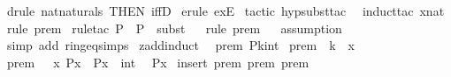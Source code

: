 \begin{isabellebody}
\ {\isacharparenleft}drule\ nat{}naturals\ {\isacharbrackleft}THEN\ iffD{}{\isacharbrackright}{\isacharparenright}\isanewline
{}\isamarkupfalse%
\ {\isacharparenleft}erule\ exE{\isacharparenright}\isanewline
{}\isamarkupfalse%
\ {\isacharparenleft}tactic\ {\isacharverbatimopen}hyp{\isacharunderscore}subst{\isacharunderscore}tac\ {}{\isacharverbatimclose}{\isacharparenright}\isanewline
{}\isamarkupfalse%
\ {\isacharparenleft}induct{\isacharunderscore}tac\ {\isachardoublequoteopen}xnat{\isachardoublequoteclose}{\isacharparenright}\isanewline
{}\isamarkupfalse%
\ {\isacharparenleft}rule\ prem{}{\isacharparenright}\isanewline
{}\isamarkupfalse%
\ {\isacharparenleft}rule{\isacharunderscore}tac\ P\ {\isacharequal}\ {\isachardoublequoteopen}P{\isachardoublequoteclose}\ \ subst{\isacharparenright}\isanewline
{}\isamarkupfalse%
\ {}\isanewline
{}\isamarkupfalse%
\ {\isacharparenleft}rule\ prem{}{\isacharparenright}\isanewline
{}\isamarkupfalse%
\ {}\isanewline
{}\isamarkupfalse%
\ assumption\isanewline
{}\isamarkupfalse%
\ {\isacharparenleft}simp\ add{\isacharcolon}\ ring{\isacharunderscore}eq{\isacharunderscore}simps{\isacharparenright}{\isacharplus}\isanewline
{}\isamarkupfalse%
%
\endisatagproof
{\isafoldproof}%
%
\isadelimproof
\isanewline
%
\endisadelimproof
\isanewline
\isanewline
{}\isamarkupfalse%
\ z{\isacharunderscore}add{\isacharunderscore}induct{\isacharcolon}\ \isanewline
{}\ prem{}{\isacharcolon}\ {\isachardoublequoteopen}P{\isacharparenleft}k{\isacharcolon}{\isacharcolon}int{\isacharparenright}{\isachardoublequoteclose}\isanewline
{}\ prem{}{\isacharcolon}\ \ {\isachardoublequoteopen}k\ {\isacharless}{\isacharequal}\ x{\isachardoublequoteclose}\isanewline
{}\ prem{}{\isacharcolon}\ \ {\isachardoublequoteopen}{\isacharbang}{\isacharbang}\ x{\isachardot}\ P{\isacharparenleft}x{\isacharparenright}\ {\isacharequal}{\isacharequal}{\isachargreater}\ P{\isacharparenleft}x\ {\isacharplus}\ int\ {}{\isacharparenright}{\isachardoublequoteclose}\isanewline
{}\ {\isachardoublequoteopen}P{\isacharparenleft}x{\isacharparenright}{\isachardoublequoteclose}\isanewline
%
\isadelimproof
%
\endisadelimproof
%
\isatagproof
{}\isamarkupfalse%
\ {\isacharparenleft}insert\ prem{}\ prem{}\ prem{}{\isacharparenright}\isanewline

\end{isabellebody}
